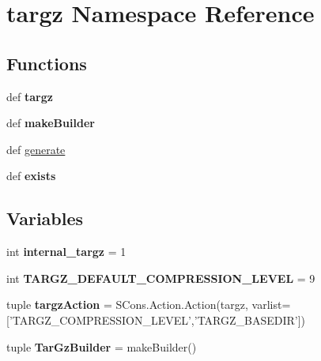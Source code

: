 \hypertarget{namespacetargz}{\section{targz Namespace Reference}
\label{namespacetargz}
}
\subsection*{Functions}
\begin{DoxyCompactItemize}
\item 
\hypertarget{namespacetargz_abb98dc94312de11ed09b6ded31695f5c}{def {\bfseries targz}}\label{namespacetargz_abb98dc94312de11ed09b6ded31695f5c}

\item 
\hypertarget{namespacetargz_a3c0296b84d90f437c50bc870b885d8be}{def {\bfseries make\+Builder}}\label{namespacetargz_a3c0296b84d90f437c50bc870b885d8be}

\item 
def \hyperlink{namespacetargz_ab7462b688438a878ee950fe4bea1f5d7}{generate}
\item 
\hypertarget{namespacetargz_a2913e769e9e7c16abf68b5bc892d74e0}{def {\bfseries exists}}\label{namespacetargz_a2913e769e9e7c16abf68b5bc892d74e0}

\end{DoxyCompactItemize}
\subsection*{Variables}
\begin{DoxyCompactItemize}
\item 
\hypertarget{namespacetargz_a42e34fbb19da65e12b3eec8c12449977}{int {\bfseries internal\+\_\+targz} = 1}\label{namespacetargz_a42e34fbb19da65e12b3eec8c12449977}

\item 
\hypertarget{namespacetargz_a333ff68b37be1939e66d320c343254c0}{int {\bfseries T\+A\+R\+G\+Z\+\_\+\+D\+E\+F\+A\+U\+L\+T\+\_\+\+C\+O\+M\+P\+R\+E\+S\+S\+I\+O\+N\+\_\+\+L\+E\+V\+E\+L} = 9}\label{namespacetargz_a333ff68b37be1939e66d320c343254c0}

\item 
\hypertarget{namespacetargz_aaeec7e85f4ca616a4e6399ee068f22a0}{tuple {\bfseries targz\+Action} = S\+Cons.\+Action.\+Action(targz, varlist=\mbox{[}'T\+A\+R\+G\+Z\+\_\+\+C\+O\+M\+P\+R\+E\+S\+S\+I\+O\+N\+\_\+\+L\+E\+V\+E\+L','T\+A\+R\+G\+Z\+\_\+\+B\+A\+S\+E\+D\+I\+R'\mbox{]})}\label{namespacetargz_aaeec7e85f4ca616a4e6399ee068f22a0}

\item 
\hypertarget{namespacetargz_a45fa55fd6ce8bf4b5d55714d1ea1a03b}{tuple {\bfseries Tar\+Gz\+Builder} = make\+Builder()}\label{namespacetargz_a45fa55fd6ce8bf4b5d55714d1ea1a03b}

\end{DoxyCompactItemize}


